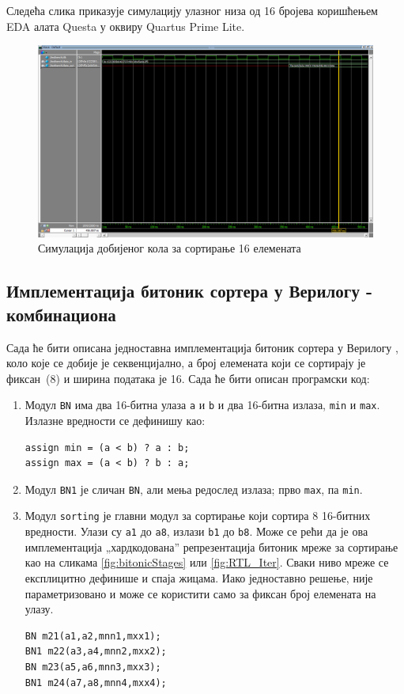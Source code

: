 \documentclass[12pt, a4paper]{article}
\theoremstyle{definition}
\begin{document}
Следећа слика приказује симулацију улазног низа од 16 бројева коришћењем EDA алата Questa у оквиру Quartus Prime Lite.

\begin{figure}[H]
  \centering
      \includegraphics[scale=0.4]{slike/quartusSim.png}
  \caption{Симулација добијеног кола за сортирање 16 елемената}
  \label{fig:quartusSim}
\end{figure}

\newpage
\subsection{Имплементација битоник сортера у Верилогу - комбинациона}
Сада ће бити описана једноставна имплементација битоник сортера у Верилогу \cite{git_verilogProsto}, коло које се добије је секвенцијално, а број елемената који се сортирају је \mbox{фиксан (8)} и ширина података је 16. Сада ће бити описан програмски код:
\begin{enumerate}
 \item Модул \verb+BN+ има два 16-битна улаза \verb+a+ и \verb+b+ и два 16-битна излаза, \verb+min+ и \verb+max+. Излазне вредности се дефинишу као:
 \begin{verbatim}
assign min = (a < b) ? a : b;
assign max = (a < b) ? b : a;
 \end{verbatim}
  \item Модул \verb+BN1+ је сличан \verb+BN+, али мења редослед излаза; прво \verb+max+, па \verb+min+.
\item Модул \verb+sorting+ је главни модул за сортирање који сортира 8 16-битних вредности. Улази су \verb+a1+ до \verb+a8+, излази \verb+b1+ до \verb+b8+. Може се рећи да је ова имплементација „хардкодована” репрезентација битоник мреже за сортирање као на сликама \ref{fig:bitonicStages} или \ref{fig:RTL_Iter}. Сваки ниво мреже се експлицитно дефинише и спаја жицама. Иако једноставно решење, није параметризовано и може се користити само за фиксан број елемената на улазу.
\begin{verbatim}
BN m21(a1,a2,mnn1,mxx1);
BN1 m22(a3,a4,mnn2,mxx2);
BN m23(a5,a6,mnn3,mxx3);
BN1 m24(a7,a8,mnn4,mxx4);
 \end{verbatim}
\end{enumerate}
\end{document}
